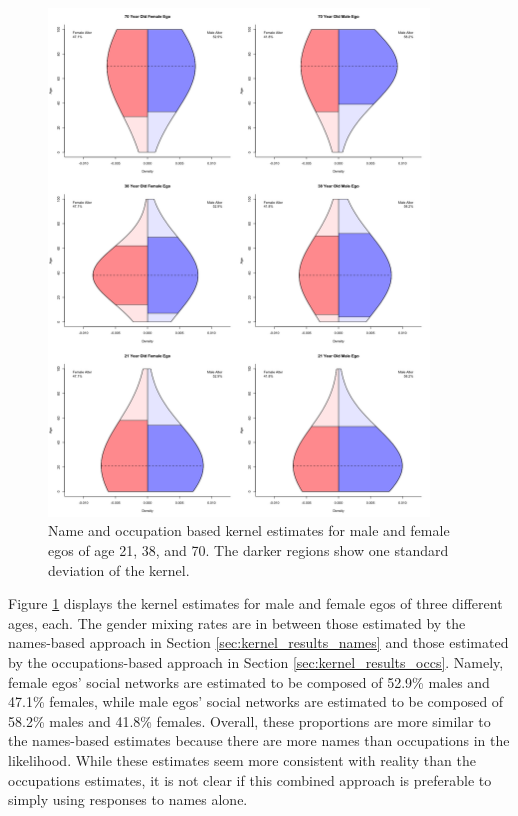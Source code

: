 \begin{figure}
\includegraphics[width=0.9\textwidth]{figures/kernel/comb/kern_sexage.png}
\caption{Name and occupation based kernel estimates for male and female egos of age 21, 38, and 70. The darker regions show one standard deviation of the kernel.}
\label{fig:comb_kernel_sexage}
\end{figure}

Figure \ref{fig:comb_kernel_sexage} displays the kernel estimates for male and female egos of three different ages, each. The gender mixing rates are in between those estimated by the names-based approach in Section \ref{sec:kernel_results_names} and those estimated by the occupations-based approach in Section \ref{sec:kernel_results_occs}. Namely, female egos' social networks are estimated to be composed of 52.9\% males and 47.1\% females, while male egos' social networks are estimated to be composed of 58.2\% males and 41.8\% females. Overall, these proportions are more similar to the names-based estimates because there are more names than occupations in the likelihood. While these estimates seem more consistent with reality than the occupations estimates, it is not clear if this combined approach is preferable to simply using responses to names alone.

